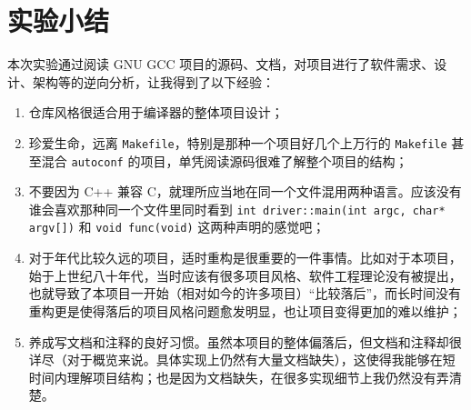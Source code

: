 \documentclass[12pt]{ctexrep}
\begin{document}
    \chapter{实验小结}

    本次实验通过阅读 GNU GCC 项目的源码、文档，对项目进行了软件需求、设计、架构等的逆向分析，让我得到了以下经验：

    \begin{enumerate}
        \item 仓库风格很适合用于编译器的整体项目设计；
        \item 珍爱生命，远离 \verb|Makefile|，特别是那种一个项目好几个上万行的 \verb|Makefile| 甚至混合 \verb|autoconf| 的项目，单凭阅读源码很难了解整个项目的结构；
        \item 不要因为 C++ 兼容 C，就理所应当地在同一个文件混用两种语言。应该没有谁会喜欢那种同一个文件里同时看到 \texttt{int driver::main(int argc, char* argv[])} 和 \texttt{void func(void)} 这两种声明的感觉吧；
        \item 对于年代比较久远的项目，适时重构是很重要的一件事情。比如对于本项目，始于上世纪八十年代，当时应该有很多项目风格、软件工程理论没有被提出，也就导致了本项目一开始（相对如今的许多项目）``比较落后''，而长时间没有重构更是使得落后的项目风格问题愈发明显，也让项目变得更加的难以维护；
        \item 养成写文档和注释的良好习惯。虽然本项目的整体偏落后，但文档和注释却很详尽（对于概览来说。具体实现上仍然有大量文档缺失），这使得我能够在短时间内理解项目结构；也是因为文档缺失，在很多实现细节上我仍然没有弄清楚。
    \end{enumerate}

    
\end{document}

